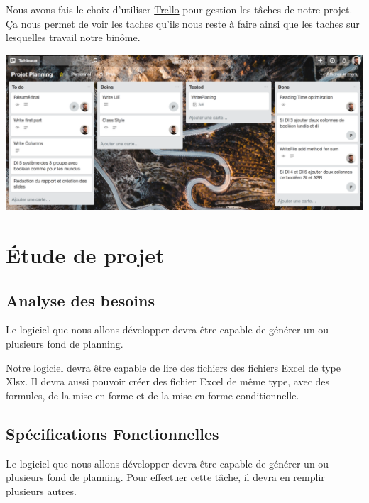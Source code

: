 \documentclass{polytech/polytech}
\begin{document}
	Nous avons fais le choix d'utiliser \href{https://trello.com/}{Trello} pour gestion les tâches de notre projet.
	Ça nous permet de voir les taches qu'ils nous reste à faire ainsi que les taches sur lesquelles travail notre binôme.

	\includegraphics[width=\textwidth]{./img/trello.png}

	\chapter{Étude de projet}
	\section{Analyse des besoins}
	
	Le logiciel que nous allons développer devra être capable de générer un ou plusieurs fond de planning.
	
	Notre logiciel devra être capable de lire des fichiers des fichiers Excel de type Xlsx.
	Il devra aussi pouvoir créer des fichier Excel de même type, avec des formules, de la mise en forme et de la mise en forme conditionnelle.	

	\section{Spécifications Fonctionnelles}
	
	Le logiciel que nous allons développer devra être capable de générer un ou plusieurs fond de planning. Pour effectuer cette tâche, il devra en remplir plusieurs autres.
	
\end{document}

